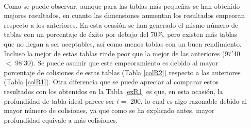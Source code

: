 \documentclass[12pt,spanish,listoffigures,listoftables]{tfgetsinf}
\begin{document}
\def\arraystretch{1.5}
\begin{table}[H]
	\centering
	\caption{Porcentajes de éxito para las tablas que emplean \textbf{R2}}
	\label{exR2}
\end{table}
~\\

Como se puede observar, aunque para las tablas más pequeñas se han obtenido mejores resultados, en cuanto las dimensiones aumentan los resultados empeoran respecto a los anteriores. En esta ocasión se han generado el mismo número de tablas con un porcentaje de éxito por debajo del 70\%, pero existen más tablas que no llegan a ser aceptables, así como menos tablas con un buen rendimiento. Incluso la mejor de estas tablas rinde peor que la mejor de las anteriores (97'40 $<$ 98'30). Se puede asumir que este empeoramiento es debido al mayor porcentaje de colisiones de estas tablas (Tabla \ref{colR2}) respecto a las anteriores (Tabla \ref{colR1}). Otra diferencia que se puede apreciar al comparar estos resultados con los obtenidos en la Tabla \ref{exR1} es que, en esta ocasión, la profundidad de tabla ideal parece ser $t =$ 200, lo cual es algo razonable debido al mayor número de colisiones, ya que como se ha explicado antes, mayor profundidad equivale a más colisiones.
\end{document}
